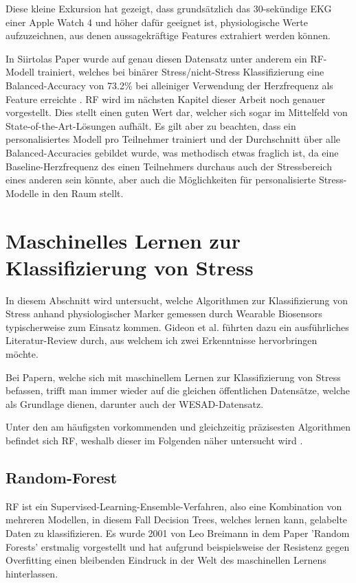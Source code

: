 Diese kleine Exkursion hat gezeigt, dass grundsätzlich das 30-sekündige \ac{EKG} einer Apple Watch 4 und höher dafür geeignet ist, physiologische Werte aufzuzeichnen, aus denen aussagekräftige Features extrahiert werden können.

In Siirtolas Paper wurde auf genau diesen Datensatz unter anderem ein \ac{RF}-Modell trainiert, welches bei binärer Stress/nicht-Stress Klassifizierung eine Balanced-Accuracy von 73.2\% bei alleiniger Verwendung der Herzfrequenz als Feature erreichte \cite{Siirtola2019}. \ac{RF} wird im nächsten Kapitel dieser Arbeit noch genauer vorgestellt. Dies stellt einen guten Wert dar, welcher sich sogar im Mittelfeld von State-of-the-Art-Lösungen aufhält. Es gilt aber zu beachten, dass ein personalisiertes Modell pro Teilnehmer trainiert und der Durchschnitt über alle Balanced-Accuracies gebildet wurde, was methodisch etwas fraglich ist, da eine Baseline-Herzfrequenz des einen Teilnehmers durchaus auch der Stressbereich eines anderen sein könnte, aber auch die Möglichkeiten für personalisierte Stress-Modelle in den Raum stellt.

\section{Maschinelles Lernen zur Klassifizierung von Stress}
In diesem Abschnitt wird untersucht, welche Algorithmen zur Klassifizierung von Stress anhand physiologischer Marker gemessen durch Wearable Biosensors typischerweise zum Einsatz kommen. Gideon et al. führten dazu ein ausführliches Literatur-Review durch, aus welchem ich zwei Erkenntnisse hervorbringen möchte.

Bei Papern, welche sich mit maschinellem Lernen zur Klassifizierung von Stress befassen, trifft man immer wieder auf die gleichen öffentlichen Datensätze, welche als Grundlage dienen, darunter auch der WESAD-Datensatz.

Unter den am häufigsten vorkommenden und gleichzeitig präzisesten Algorithmen befindet sich \ac{RF}, weshalb dieser im Folgenden näher untersucht wird \cite{VOS2023105026}.

\subsection{Random-Forest}

\ac{RF} ist ein Supervised-Learning-Ensemble-Verfahren, also eine Kombination von mehreren Modellen, in diesem Fall Decision Trees, welches lernen kann, gelabelte Daten zu klassifizieren. Es wurde 2001 von Leo Breimann in dem Paper 'Random Forests' erstmalig vorgestellt und hat aufgrund beispielsweise der Resistenz gegen Overfitting einen bleibenden Eindruck in der Welt des maschinellen Lernens hinterlassen.

